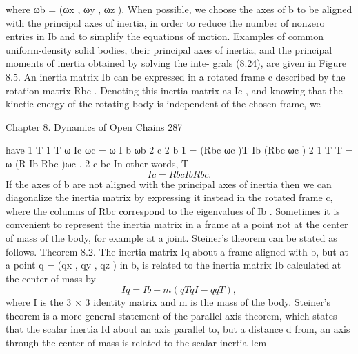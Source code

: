 \documentclass[12pt,a4paper]{article}
\begin{document}
where ωb = (ωx , ωy , ωz ). When possible, we choose the axes of {b} to be aligned
with the principal axes of inertia, in order to reduce the number of nonzero
entries in Ib and to simplify the equations of motion.
    Examples of common uniform-density solid bodies, their principal axes of
inertia, and the principal moments of inertia obtained by solving the inte-
grals (8.24), are given in Figure 8.5.
    An inertia matrix Ib can be expressed in a rotated frame {c} described by
the rotation matrix Rbc . Denoting this inertia matrix as Ic , and knowing that
the kinetic energy of the rotating body is independent of the chosen frame, we


Chapter 8. Dynamics of Open Chains                                                                  287

have
                            1 T                  1 T
                             ω Ic ωc       =       ω I b ωb
                            2 c                  2 b
                                                 1
                                           =       (Rbc ωc )T Ib (Rbc ωc )
                                                 2
                                                 1 T T
                                           =       ω (R Ib Rbc )ωc .
                                                 2 c bc
In other words,
                                                T
\begin{equation}
Ic = Rbc Ib Rbc .
\label{eq:8.26}
\end{equation}
If the axes of {b} are not aligned with the principal axes of inertia then we can
diagonalize the inertia matrix by expressing it instead in the rotated frame {c},
where the columns of Rbc correspond to the eigenvalues of Ib .
    Sometimes it is convenient to represent the inertia matrix in a frame at a
point not at the center of mass of the body, for example at a joint. Steiner’s
theorem can be stated as follows.
Theorem 8.2. The inertia matrix Iq about a frame aligned with {b}, but at a
point q = (qx , qy , qz ) in {b}, is related to the inertia matrix Ib calculated at the
center of mass by
\begin{equation}
Iq = Ib + m(q T qI − qq T ),
\label{eq:8.27}
\end{equation}
where I is the 3 × 3 identity matrix and m is the mass of the body.
    Steiner’s theorem is a more general statement of the parallel-axis theorem,
which states that the scalar inertia Id about an axis parallel to, but a distance
d from, an axis through the center of mass is related to the scalar inertia Icm
\end{document}
